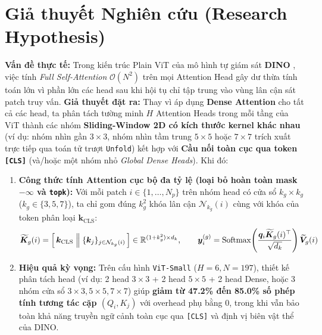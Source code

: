 \documentclass[10pt,a4paper]{article}
\begin{document}
\small

\section{Giả thuyết Nghiên cứu (Research Hypothesis)}

\textbf{Vấn đề thực tế:} Trong kiến trúc Plain ViT \cite{dosovitskiy2020image} của mô hình tự giám sát \textbf{DINO} \cite{caron2021emerging}, việc tính \textit{Full Self-Attention} $\mathcal{O}(N^2)$ trên mọi Attention Head gây dư thừa tính toán lớn vì phần lớn các head sau khi hội tụ chỉ tập trung vào vùng lân cận sát patch truy vấn. 
\textbf{Giả thuyết đặt ra:} Thay vì áp dụng \textbf{Dense Attention} cho tất cả các head, ta phân tách tường minh $H$ Attention Heads trong mỗi tầng của ViT thành các nhóm \textbf{Sliding-Window 2D có kích thước kernel khác nhau} (ví dụ: nhóm nhìn gần $3\times 3$, nhóm nhìn tầm trung $5\times 5$ hoặc $7\times 7$ trích xuất trực tiếp qua toán tử trượt \texttt{Unfold}) kết hợp với \textbf{Cầu nối toàn cục qua token \texttt{[CLS]}} (và/hoặc một nhóm nhỏ \textit{Global Dense Heads}). Khi đó:
\begin{enumerate}[leftmargin=1.4em, itemsep=0pt, topsep=1pt]
    \item \textbf{Công thức tính Attention cục bộ đa tỷ lệ (loại bỏ hoàn toàn mask $-\infty$ và \texttt{topk}):} Với mỗi patch $i \in \{1,\dots,N_p\}$ trên nhóm head có cửa sổ $k_g \times k_g$ ($k_g \in \{3, 5, 7\}$), ta chỉ gom đúng $k_g^2$ khóa lân cận $\mathcal{N}_{k_g}(i)$ cùng với khóa của token phân loại $\bm{k}_{\mathrm{CLS}}$:
    \vspace{-0.4em}
    \begin{equation*}
        \widetilde{\bm{K}}_g(i) = \Big[\, \bm{k}_{\mathrm{CLS}} \;\Big\Vert\; \{\bm{k}_j\}_{j \in \mathcal{N}_{k_g}(i)} \,\Big] \in \mathbb{R}^{(1 + k_g^2)\times d_k}, \qquad
        \bm{y}_i^{(g)} = \mathrm{Softmax}\!\left(\frac{\bm{q}_i \widetilde{\bm{K}}_g(i)^\top}{\sqrt{d_k}}\right)\widetilde{\bm{V}}_g(i)
    \vspace{-0.4em}
    \end{equation*}
    \item \textbf{Hiệu quả kỳ vọng:} Trên cấu hình \texttt{ViT-Small} ($H=6, N=197$), thiết kế phân tách head (ví dụ: 2 head $3\times 3$ + 2 head $5\times 5$ + 2 head Dense, hoặc 3 nhóm cửa sổ $3\times 3, 5\times 5, 7\times 7$) giúp \textbf{giảm từ 47.2\% đến 85.0\% số phép tính tương tác cặp $(Q_i, K_j)$} với overhead phụ bằng $0$, trong khi vẫn bảo toàn khả năng truyền ngữ cảnh toàn cục qua \texttt{[CLS]} và định vị biên vật thể của DINO.
\end{enumerate}
\end{document}

